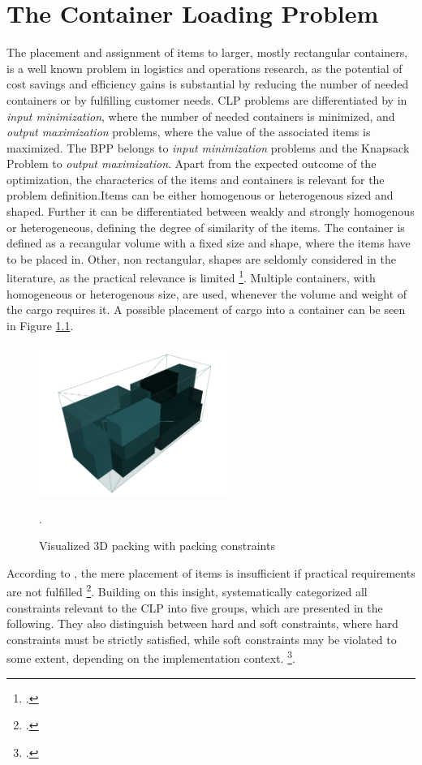 \chapter{The Container Loading Problem}
\label{sec:clp_definition}

The placement and assignment of items to larger, mostly rectangular
containers, is a well known problem in logistics and operations research, as the
potential of cost savings and efficiency gains is substantial by reducing the number
of needed containers or by fulfilling customer needs.
\gls{CLP} problems are differentiated by \citeauthor*{bortfeldt_constraints_2013} in \textit{input minimization},
where the number of needed containers is minimized, and \textit{output maximization} problems,
where the value of the associated items is maximized. The \gls{BPP} belongs to \textit{input minimization} problems
and the Knapsack Problem to \textit{output maximization}. Apart from the expected outcome of the optimization,
the characterics of the items and containers is relevant for the problem definition.Items can be either
homogenous or heterogenous sized and shaped. Further it can be differentiated between weakly and strongly
homogenous or heterogeneous, defining the degree of similarity of the items. The container is
defined as a recangular volume with a fixed size and shape, where the items have to be placed in.
Other, non rectangular, shapes are seldomly considered in the literature, as the practical relevance is
limited \footcite[cf.][pp.1--2]{bortfeldt_constraints_2013}. Multiple containers, with homogeneous
or heterogenous size, are used, whenever the volume and weight of the cargo requires it.
A possible placement of cargo into a container can be seen in Figure \ref{fig:solution-visualization}.
\begin{figure}[ht]
    \centering
    \includegraphics[width=6.3cm]{pictures/3l_cvrp_example.png}
    \caption[Visualized 3D packing with packing constraints]{Visualized 3D packing with packing constraints\footnotemark}.
    \label{fig:solution-visualization}
\end{figure}
\clearpage
According to \citeauthor*{bischoff_issues_1995}, the mere placement of items is insufficient
if practical requirements are not fulfilled \footcite[cf.][pp.1--2]{bischoff_issues_1995}. Building on this insight,
\citeauthor*{bortfeldt_constraints_2013} systematically categorized all constraints relevant
to the \gls{CLP} into five groups, which are presented in the following. They also distinguish between hard and soft constraints,
where hard constraints must be strictly satisfied, while soft constraints may be violated
to some extent, depending on the implementation context. \footcite[cf.][p.2]{bortfeldt_constraints_2013}.

